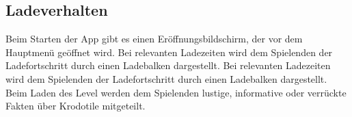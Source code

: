 \subsection{Ladeverhalten}
\begin {requirements}
	 Beim Starten der App gibt es einen Eröffnungsbildschirm, der vor dem Hauptmenü geöffnet wird.
	 Bei relevanten Ladezeiten wird dem Spielenden der Ladefortschritt durch einen Ladebalken dargestellt.
	 Bei relevanten Ladezeiten wird dem Spielenden der Ladefortschritt durch einen Ladebalken dargestellt.
	 Beim Laden des Level werden dem Spielenden lustige, informative oder verrückte Fakten über Krodotile mitgeteilt.
\end {requirements}
